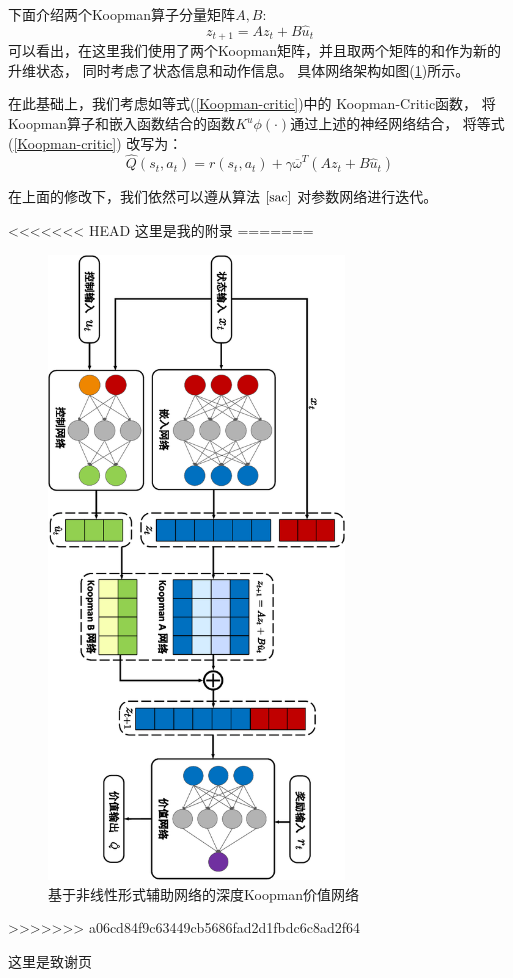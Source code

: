 \documentclass[AutoFakeBold]{LZUThesis}
\begin{document}
下面介绍两个Koopman算子分量矩阵$A, B$:
\begin{equation}
  z_{t + 1} = A z_t + B \hat{u}_t
\end{equation}
可以看出，在这里我们使用了两个Koopman矩阵，并且取两个矩阵的和作为新的升维状态，
同时考虑了状态信息和动作信息。
具体网络架构如图(\ref{DKN_critic})所示。

在此基础上，我们考虑如等式(\ref{Koopman-critic})中的 Koopman-Critic函数，
将Koopman算子和嵌入函数结合的函数$K^u \phi(\cdot)$通过上述的神经网络结合，
将等式 (\ref{Koopman-critic}) 改写为：
\begin{equation}
  \hat{Q}(s_t, a_t) = r(s_t, a_t)
  + \gamma \overline{\omega}^T ( A z_t + B \hat{u}_t )
\end{equation}

在上面的修改下，我们依然可以遵从算法 
$\ref{sac}$ 对参数网络进行迭代。


\backmatter


\printbib

\Appendix

<<<<<<< HEAD
这里是我的附录
=======
\begin{figure}[htbp]
  \centering
  \includegraphics[width=0.7\textwidth]{figures/dkn-rotate.pdf}
  \caption{基于非线性形式辅助网络的深度Koopman价值网络}
  \label{DKN_critic}
\end{figure}
>>>>>>> a06cd84f9c63449cb5686fad2d1fbdc6c8ad2f64

\Thanks

这里是致谢页

\Grade %
\end{document}

